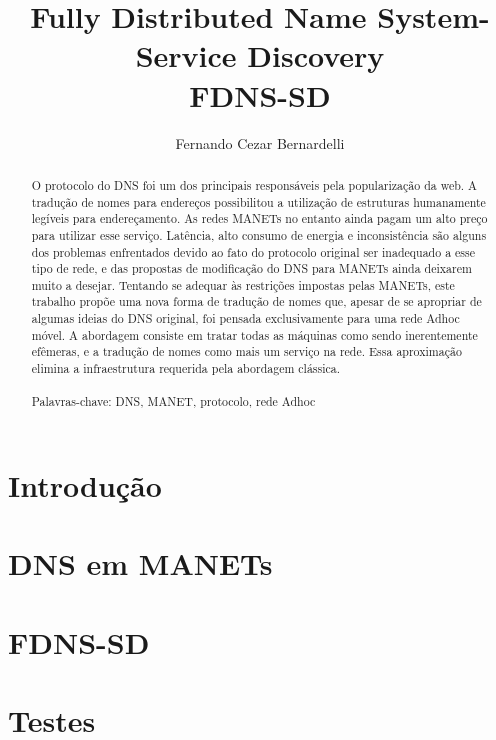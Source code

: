 \documentclass[12pt,a4paper]{style/ufpr}
\title{Fully Distributed Name System-Service Discovery\\FDNS-SD}
\author{Fernando Cezar Bernardelli}
\date{}
\begin{document}
\makecapaproposta
\makecapaproposta

\begin{abstract}
    O protocolo do DNS foi um dos principais responsáveis pela popularização da
    web. A tradução de nomes para endereços possibilitou a utilização de estruturas
    humanamente legíveis para endereçamento. As redes MANETs no entanto ainda pagam
    um alto preço para utilizar esse serviço. Latência, alto consumo de energia e
    inconsistência são alguns dos problemas enfrentados devido ao fato do
    protocolo original ser inadequado a esse tipo de rede, e das propostas de modificação
    do DNS para MANETs ainda deixarem muito a desejar. Tentando se adequar às
    restrições impostas pelas MANETs, este trabalho propõe uma nova forma de
    tradução de nomes que, apesar de se apropriar de algumas ideias do DNS
    original, foi pensada exclusivamente para uma rede Adhoc móvel. A abordagem
    consiste em tratar todas as máquinas como sendo inerentemente efêmeras, e a
    tradução de nomes como mais um serviço na rede. Essa aproximação elimina a
    infraestrutura requerida pela abordagem clássica.
    \\
    \\
    Palavras-chave: DNS, MANET, protocolo, rede Adhoc
\end{abstract}

\tableofcontents
\listoffigures
\newpage

\chapter{Introdução}


\chapter{DNS em MANETs}


\chapter{FDNS-SD}


\chapter{Testes}


\newpage


\end{document}
